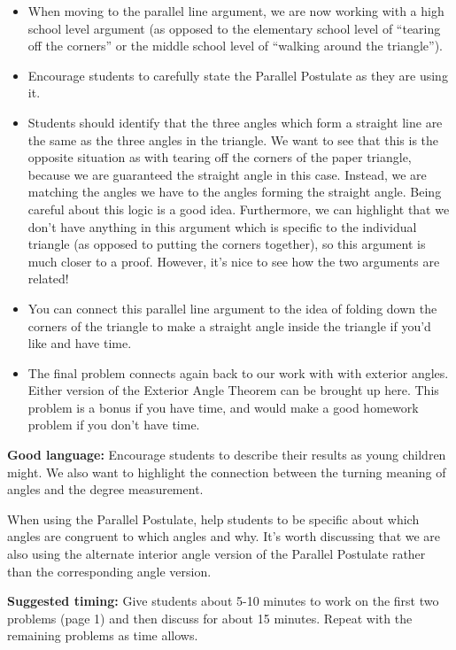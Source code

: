 \documentclass[nooutcomes,noauthor]{ximera}
\begin{document}
\begin{instructorNotes}
\begin{itemize}
\item When moving to the parallel line argument, we are now working with a high school level argument (as opposed to the elementary school level of ``tearing off the corners'' or the middle school level of ``walking around the triangle''). 
\item Encourage students to carefully state the Parallel Postulate as they are using it. 
\item Students should identify that the three angles which form a straight line are the same as the three angles in the triangle. We want to see that this is the opposite situation as with tearing off the corners of the paper triangle, because we are guaranteed the straight angle in this case. Instead, we are matching the angles we have to the angles forming the straight angle. Being careful about this logic is a good idea. Furthermore, we can highlight that we don't have anything in this argument which is specific to the individual triangle (as opposed to putting the corners together), so this argument is much closer to a proof. However, it's nice to see how the two arguments are related!
\item You can connect this parallel line argument to the idea of folding down the corners of the triangle to make a straight angle inside the triangle if you'd like and have time.
\item The final problem connects again back to our work with with exterior angles. Either version of the Exterior Angle Theorem can be brought up here. This problem is a bonus if you have time, and would make a good homework problem if you don't have time.
\end{itemize}

{\bf Good language:} Encourage students to describe their results as young children might. We also want to highlight the connection between the turning meaning of angles and the degree measurement.

When using the Parallel Postulate, help students to be specific about which angles are congruent to which angles and why. It's worth discussing that we are also using the alternate interior angle version of the Parallel Postulate rather than the corresponding angle version.



{\bf Suggested timing:} Give students about 5-10 minutes to work on the first two problems (page 1) and then discuss for about 15 minutes. Repeat with the remaining problems as time allows.




\end{instructorNotes}
\end{document}
